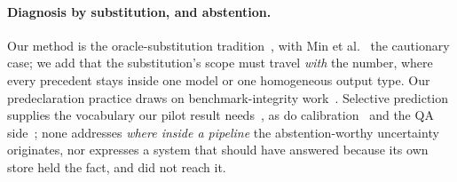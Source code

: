 \paragraph{Diagnosis by substitution, and abstention.}
Our method is the oracle-substitution tradition~\cite{hoiem2012diagnosing, bolya2020tide,
hosang2016proposals, zellers2018motifs}, with Min et al.~\cite{min2019compositional} the
cautionary case; we add that the substitution's scope must travel \emph{with} the
number, where every precedent stays inside one model or one homogeneous output type. Our
predeclaration practice draws on benchmark-integrity work~\cite{musgrave2020reality,
dacrema2019progress, lipton2019troubling, bouthillier2021variance, recht2019imagenet,
bertinetto2021prereg}. Selective prediction supplies the vocabulary our pilot result
needs~\cite{chow1970reject, elyaniv2010foundations, geifman2017selective,
geifman2019selectivenet, hendrickx2024reject}, as do
calibration~\cite{guo2017calibration, kadavath2022know} and the QA
side~\cite{rajpurkar2018squad2, kamath2020selectiveqa, whitehead2022reliablevqa,
ren2024exploreuntilconfident}; none addresses \emph{where inside a pipeline} the
abstention-worthy uncertainty originates, nor expresses a system that should have
answered because its own store held the fact, and did not reach it.
